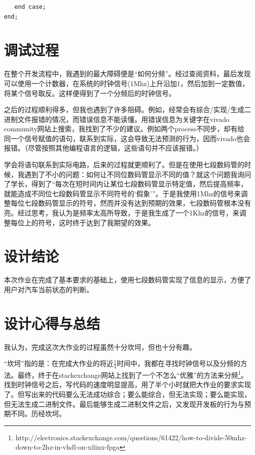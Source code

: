 \documentclass[11pt, a4paper]{article}
\begin{document}
\begin{CJK*}{UTF8}{gbsn}
\begin{verbatim}
   end case;
end;
  \end{verbatim}

  \section{调试过程}

  在整个开发流程中，我遇到的最大障碍便是“如何分频”。经过查阅资料，最后发现可以使用一个计数器，在系统的时钟信号(1Mhz)上升沿加1，然后加到一定数值，将某个信号取反。这样便得到了一个分频后的时钟信号。

  之后的过程顺利得多，但我也遇到了许多阻碍。例如，经常会有综合/实现/生成二进制文件报错的情况，而错误信息不能读懂。用错误信息为关键字在vivado community网站上搜索，我找到了不少的建议。例如两个process不同步，却有给同一个信号赋值的语句，联系到实际，这会导致无法预测的行为，因而vivado也会报错。（尽管按照其他编程语言的逻辑，这些语句并不应该报错。）

  学会将语句联系到实际电路，后来的过程就更顺利了。但是在使用七段数码管的时候，我遇到了不小的问题：如何让不同位数码管显示不同的值？就这个问题我询问了学长，得到了“每次在短时间内让某位七段数码管显示特定值，然后提高频率，就能造成不同位七段数码管显示不同符号的‘假象’”。于是我使用1Mhz的信号来调整每位七段数码管显示的符号，然而并没有达到预期的效果，七段数码管根本没有亮。经过思考，我认为是频率太高所导致，于是我生成了一个1Khz的信号，来调整每位上的符号，这时终于达到了我期望的效果。
  
  \section{设计结论}

  本次作业在完成了基本要求的基础上，使用七段数码管实现了信息的显示，方便了用户对汽车当前状态的判断。


  \section{设计心得与总结}

  我认为，完成这次大作业的过程虽然十分坎坷，但也十分有趣。

  “坎坷”指的是：在完成大作业的将近$\frac{1}{4}$时间中，我都在寻找时钟信号以及分频的方法。最终，终于在stackexchange网站上找到了一个不怎么“优雅”的方法来分频\footnote{http://electronics.stackexchange.com/questions/61422/how-to-divide-50mhz-down-to-2hz-in-vhdl-on-xilinx-fpga}。找到时钟信号之后，写代码的速度明显提高，用了半个小时就把大作业的要求实现了。但写出来的代码要么无法成功综合；要么能综合，但无法实现；要么能实现，但无法生成二进制文件。最后能够生成二进制文件之后，又发现开发板的行为与预期不同。历经坎坷。


\end{CJK*}
\end{document}
